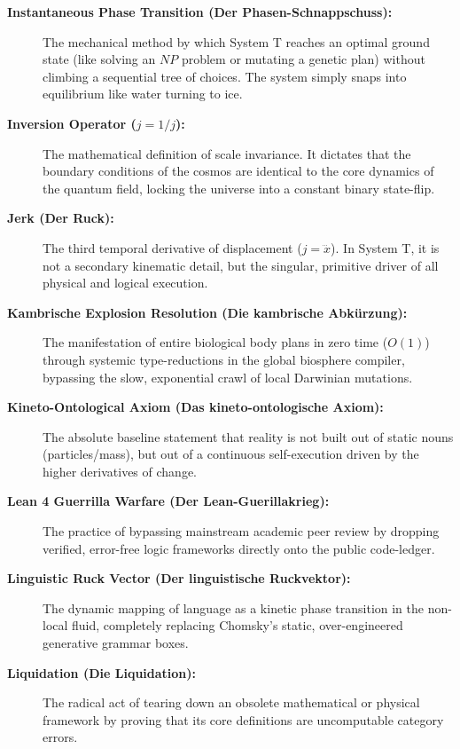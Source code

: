 \documentclass[11pt,a4paper]{article}
\begin{document}
\begin{description}
    \item[\textbf{Instantaneous Phase Transition (Der Phasen-Schnappschuss):}] The mechanical method by which System T reaches an optimal ground state (like solving an $NP$ problem or mutating a genetic plan) without climbing a sequential tree of choices. The system simply snaps into equilibrium like water turning to ice.
    
    \item[\textbf{Inversion Operator ($j = 1/j$):}] The mathematical definition of scale invariance. It dictates that the boundary conditions of the cosmos are identical to the core dynamics of the quantum field, locking the universe into a constant binary state-flip.
    
    \item[\textbf{Jerk (Der Ruck):}] The third temporal derivative of displacement ($j = \dddot{x}$). In System T, it is not a secondary kinematic detail, but the singular, primitive driver of all physical and logical execution.
    
    \item[\textbf{Kambrische Explosion Resolution (Die kambrische Abkürzung):}] The manifestation of entire biological body plans in zero time ($O(1)$) through systemic type-reductions in the global biosphere compiler, bypassing the slow, exponential crawl of local Darwinian mutations.
    
    \item[\textbf{Kineto-Ontological Axiom (Das kineto-ontologische Axiom):}] The absolute baseline statement that reality is not built out of static nouns (particles/mass), but out of a continuous self-execution driven by the higher derivatives of change.
    
    \item[\textbf{Lean 4 Guerrilla Warfare (Der Lean-Guerillakrieg):}] The practice of bypassing mainstream academic peer review by dropping verified, error-free logic frameworks directly onto the public code-ledger.
    
    \item[\textbf{Linguistic Ruck Vector (Der linguistische Ruckvektor):}] The dynamic mapping of language as a kinetic phase transition in the non-local fluid, completely replacing Chomsky's static, over-engineered generative grammar boxes.
    
    \item[\textbf{Liquidation (Die Liquidation):}] The radical act of tearing down an obsolete mathematical or physical framework by proving that its core definitions are uncomputable category errors.
    

\end{description}
\end{document}
